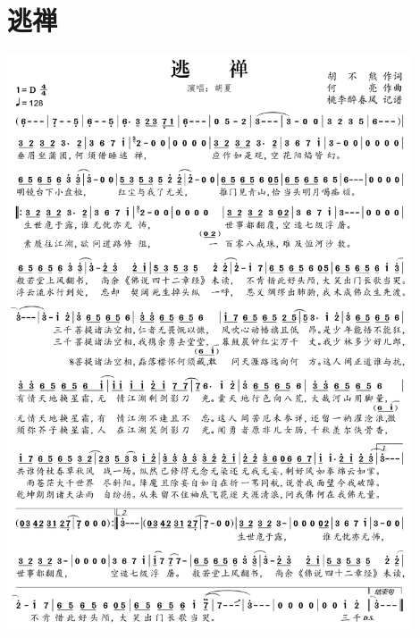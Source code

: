 \documentclass[cn,pad,twocol]{elegantbook}
\begin{document}
\section{逃禅} \includegraphics[width=0.9\textwidth]{rpi400/20210212逃禅.png}
\end{document}
